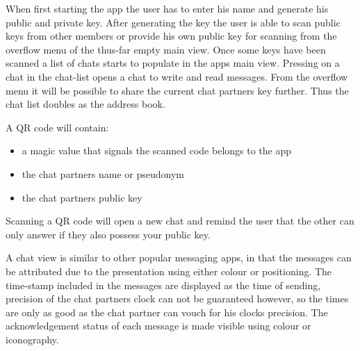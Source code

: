 When first starting the app the user has to enter his name and generate his public and private key. After generating the key the user is able to scan public keys from other members or provide his own public key for scanning from the overflow menu of the thus-far empty main view. Once some keys have been scanned a list of chats starts to populate in the apps main view. Pressing on a chat in the chat-list opens a chat to write and read messages. From the overflow menu it will be possible to share the current chat partners key further. Thus the chat list doubles as the address book.

A QR code will contain:\begin{itemize}
	\item {a magic value that signals the scanned code belongs to the app}
	\item {the chat partners name or pseudonym}
	\item {the chat partners public key}
\end{itemize}
Scanning a QR code will open a new chat and remind the user that the other can only answer if they also possess your public key.

A chat view is similar to other popular messaging apps, in that the messages can be attributed due to the presentation using either colour or positioning. The time-stamp included in the messages are displayed as the time of sending, precision of the chat partners clock can not be guaranteed however, so the times are only as good as the chat partner can vouch for his clocks precision. The acknowledgement status of each message is made visible using colour or iconography.

